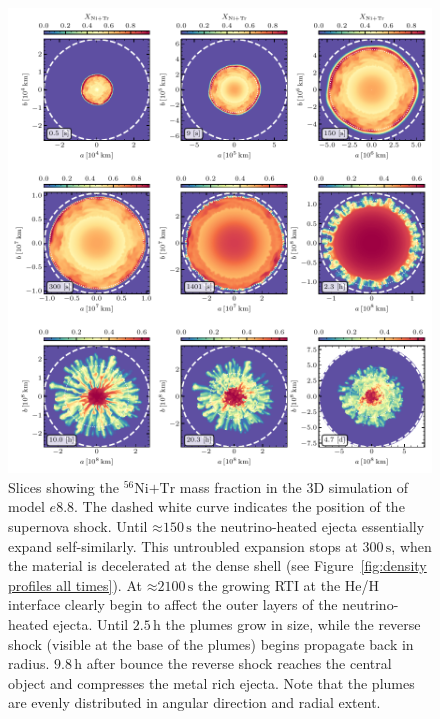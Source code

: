\documentclass[fleqn,usenatbib]{mnras}
\newcommand{\nickel}{\ensuremath{\mathrm{^{56}Ni}}\xspace}
\newcommand{\tracer}{\ensuremath{\mathrm{Tr}}\xspace}
\newcommand{\s}{\ensuremath{\text{s}}}
\begin{document}
\begin{figure}%
 \centering
 \includegraphics[width=\textwidth,trim=0.2cm 0cm 0cm 0cm,clip]{pic/e8_3d_3x3_NiX.pdf} 
 \caption{Slices
    showing the $\nickel\mathord{+}\tracer$ mass fraction in the 3D simulation of model $e8.8$. The dashed white curve indicates 
    the position of the supernova shock. Until $\mathord{\approx}150\,\s$ the neutrino-heated 
    ejecta essentially expand self-similarly. This untroubled expansion stops at
    $300\,\s$, when the material is decelerated at the dense shell 
    (see Figure~\ref{fig:density profiles all times}). At $\mathord{\approx}2100\,\s$
    the growing RTI at the He/H interface clearly begin to affect the outer 
    layers of the neutrino-heated ejecta. Until $2.5\,\text{h}$ the plumes 
    grow in size, while the reverse shock (visible at the base of the plumes)
    begins propagate back in radius. $9.8\,\text{h}$ after bounce the reverse
    shock reaches the central object and compresses the metal
    rich ejecta. Note that the plumes are evenly distributed in angular direction and radial extent. }
 \label{fig:e8 nix cuts}
\end{figure}
\end{document}
